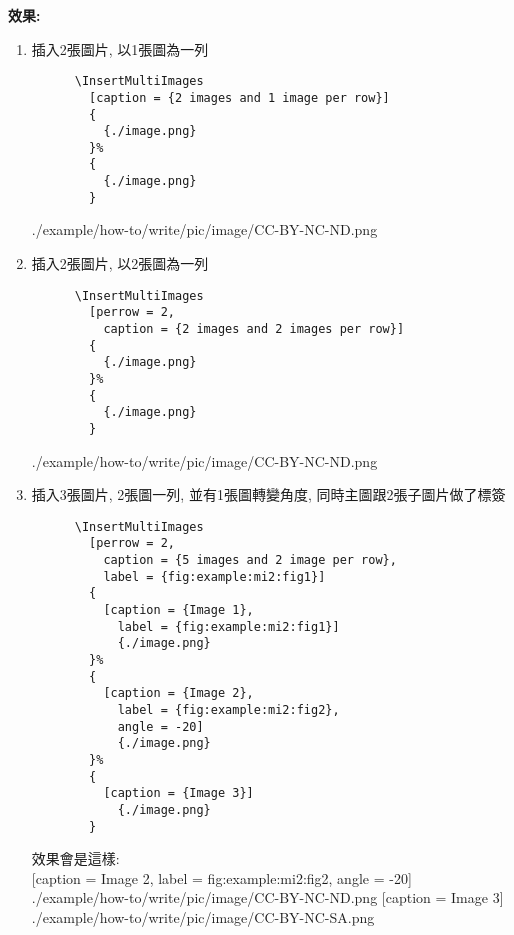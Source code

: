   \newpage

  {\bf 效果:}
  \begin{enumerate}
    \item
    {
      插入2張圖片, 以1張圖為一列
      \begin{verbatim}
      \InsertMultiImages
        [caption = {2 images and 1 image per row}]
        {
          {./image.png}
        }%
        {
          {./image.png}
        }
      \end{verbatim}
        {
          {./example/how-to/write/pic/image/CC-BY-NC-ND.png}
        }
    } %

    \item
    {
      插入2張圖片, 以2張圖為一列
      \begin{verbatim}
      \InsertMultiImages
        [perrow = 2,
          caption = {2 images and 2 images per row}]
        {
          {./image.png}
        }%
        {
          {./image.png}
        }
      \end{verbatim}
        {
          {./example/how-to/write/pic/image/CC-BY-NC-ND.png}
        }
    } %

    \newpage
    \item
    {
      插入3張圖片, 2張圖一列, 並有1張圖轉變角度, 同時主圖跟2張子圖片做了標簽
      \begin{verbatim}
      \InsertMultiImages
        [perrow = 2,
          caption = {5 images and 2 image per row},
          label = {fig:example:mi2:fig1}]
        {
          [caption = {Image 1},
            label = {fig:example:mi2:fig1}]
            {./image.png}
        }%
        {
          [caption = {Image 2},
            label = {fig:example:mi2:fig2},
            angle = -20]
            {./image.png}
        }%
        {
          [caption = {Image 3}]
            {./image.png}
        }
      \end{verbatim}

      效果會是這樣: \\
        {
          [caption = {Image 2},
            label = {fig:example:mi2:fig2},
            angle = -20]
            {./example/how-to/write/pic/image/CC-BY-NC-ND.png}
        }%
        {
          [caption = {Image 3}]
            {./example/how-to/write/pic/image/CC-BY-NC-SA.png}
        }

}
\end{enumerate}
